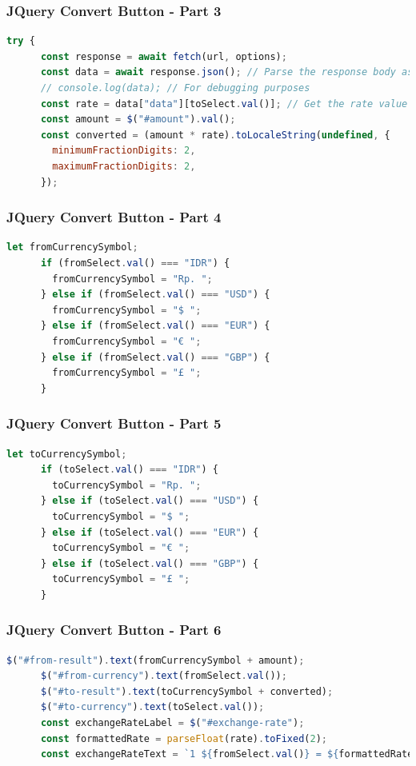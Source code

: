 \documentclass[aspectratio=169, table]{beamer}
\begin{document}
\begin{frame}[fragile]
    \frametitle{JQuery Convert Button - Part 3}
    \begin{lstlisting}[language=JavaScript]
try {
      const response = await fetch(url, options);
      const data = await response.json(); // Parse the response body as JSON
      // console.log(data); // For debugging purposes
      const rate = data["data"][toSelect.val()]; // Get the rate value for the selected currency
      const amount = $("#amount").val();
      const converted = (amount * rate).toLocaleString(undefined, {
        minimumFractionDigits: 2,
        maximumFractionDigits: 2,
      });
    \end{lstlisting}
\end{frame}

\begin{frame}[fragile]
    \frametitle{JQuery Convert Button - Part 4}
    \begin{lstlisting}[language=JavaScript]
let fromCurrencySymbol;
      if (fromSelect.val() === "IDR") {
        fromCurrencySymbol = "Rp. ";
      } else if (fromSelect.val() === "USD") {
        fromCurrencySymbol = "$ ";
      } else if (fromSelect.val() === "EUR") {
        fromCurrencySymbol = "€ ";
      } else if (fromSelect.val() === "GBP") {
        fromCurrencySymbol = "£ ";
      }
    \end{lstlisting}
\end{frame}

\begin{frame}[fragile]
    \frametitle{JQuery Convert Button - Part 5}
    \begin{lstlisting}[language=JavaScript]
let toCurrencySymbol;
      if (toSelect.val() === "IDR") {
        toCurrencySymbol = "Rp. ";
      } else if (toSelect.val() === "USD") {
        toCurrencySymbol = "$ ";
      } else if (toSelect.val() === "EUR") {
        toCurrencySymbol = "€ ";
      } else if (toSelect.val() === "GBP") {
        toCurrencySymbol = "£ ";
      }
    \end{lstlisting}
\end{frame}

\begin{frame}[fragile]
    \frametitle{JQuery Convert Button - Part 6}
    \begin{lstlisting}[language=JavaScript]
$("#from-result").text(fromCurrencySymbol + amount);
      $("#from-currency").text(fromSelect.val());
      $("#to-result").text(toCurrencySymbol + converted);
      $("#to-currency").text(toSelect.val());
      const exchangeRateLabel = $("#exchange-rate");
      const formattedRate = parseFloat(rate).toFixed(2);
      const exchangeRateText = `1 ${fromSelect.val()} = ${formattedRate} ${toSelect.val()}`;
    \end{lstlisting}
\end{frame}
\end{document}
